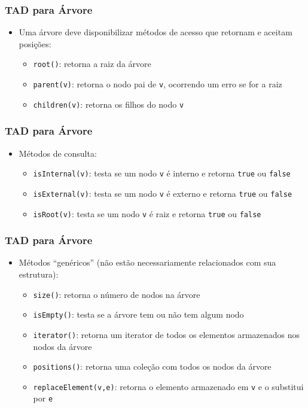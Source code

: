 \documentclass[aspectratio=169]{beamer}
\begin{document}
\begin{frame}\frametitle{TAD para Árvore}
\begin{itemize}
	\item Uma árvore deve disponibilizar métodos de acesso que retornam e aceitam posições:
	\begin{itemize}
		\item \texttt{root()}: retorna a raiz da árvore
		\item \texttt{parent(v)}: retorna o nodo pai de \texttt{v}, ocorrendo um erro se for a raiz
		\item \texttt{children(v)}: retorna os filhos do nodo \texttt{v}
	\end{itemize}
\end{itemize}
\end{frame}

\begin{frame}\frametitle{TAD para Árvore}
\begin{itemize}
	\item Métodos de consulta:
	\begin{itemize}
		\item \texttt{isInternal(v)}: testa se um nodo \texttt{v} é interno e retorna \texttt{true} ou \texttt{false}
		\item \texttt{isExternal(v)}: testa se um nodo \texttt{v} é externo e retorna \texttt{true} ou \texttt{false}
		\item \texttt{isRoot(v)}: testa se um nodo \texttt{v} é raiz e retorna \texttt{true} ou \texttt{false}
	\end{itemize}
\end{itemize}
\end{frame}

\begin{frame}\frametitle{TAD para Árvore}
\begin{itemize}
	\item Métodos ``genéricos'' (não estão necessariamente relacionados com sua estrutura):
	\begin{itemize}
		\item \texttt{size()}: retorna o número de nodos na árvore
		\item \texttt{isEmpty()}: testa se a árvore tem ou não tem algum nodo
		\item \texttt{iterator()}: retorna um iterator de todos os elementos armazenados nos nodos da árvore
		\item \texttt{positions()}: retorna uma coleção com todos os nodos da árvore
		\item \texttt{replaceElement(v,e)}: retorna o elemento armazenado em \texttt{v} e o substitui por \texttt{e}
	\end{itemize}
\end{itemize}
\end{frame}
\end{document}
